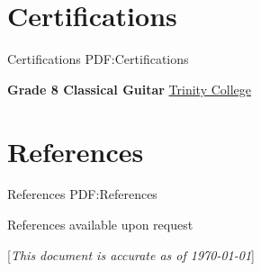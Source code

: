\documentclass[a4paper,10pt,oneside]{article}
\newcommand{\CVNote}{This document is accurate as of {\today}}
\begin{document}
\begin{body}
\section
{Certifications}
{Certifications}
{PDF:Certifications}





\textbf{Grade 8 Classical Guitar}
\href{http://www.trinitycollege.com/}{Trinity College}
\hfill {}



\section
{References}
{References}
{PDF:References}



\par References available upon request





\end{body}


\begin{flushright}
\scriptsize%
[\textit{\CVNote}]%
\hspace{2.0mm}\null
\end{flushright}

\label{LastPage}~
\end{document}
